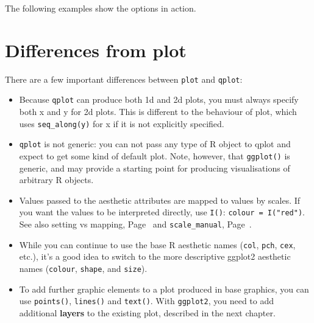 The following examples show the options in action.

% 


\section{Differences from plot}
\label{sec:plot_diffs}

There are a few important differences between {\tt plot} and {\tt qplot}:

\begin{itemize}
  \item Because {\tt qplot} can produce both 1d and 2d plots, you must always specify both x and y for 2d plots.  This is different to the behaviour of plot, which uses {\tt seq\_along(y)} for x if it is not explicitly specified.
  
  \item {\tt qplot} is not generic: you can not pass any type of R object to qplot and expect to get some kind of default plot.  Note, however, that {\tt ggplot()} is generic, and may provide a starting point for producing visualisations of arbitrary R objects.
  
  \item Values passed to the aesthetic attributes are mapped to values by scales.  If you want the values to be interpreted directly, use {\tt I()}: {\tt colour = I("red")}.  See also setting vs mapping, Page~\pageref{sub:setting-mapping} and {\tt scale\_manual}, Page~\pageref{sec:scale_special}.        %
  
  \item While you can continue to use the base R aesthetic names ({\tt col},  {\tt pch}, {\tt cex}, etc.), it's a good idea to switch to the more descriptive ggplot2 aesthetic names ({\tt colour}, {\tt shape}, and {\tt size}).


  \item To add further graphic elements to a plot produced in base graphics, you can use {\tt points()}, {\tt lines()} and {\tt text()}.  With {\tt ggplot2}, you need to add additional {\bf layers} to the existing plot, described in the next chapter.
  
\end{itemize}


